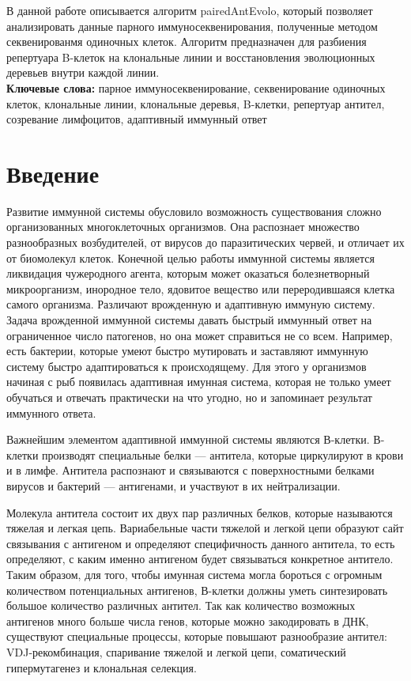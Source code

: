 \documentclass{spbau-diploma}
\begin{document}
В данной работе описывается алгоритм  pairedAntEvolo, который позволяет анализировать данные парного иммуносеквенирования, полученные методом секвенированмя одиночных клеток.
Алгоритм предназначен для разбиения репертуара B-клеток на клональные линии и восстановления эволюционных деревьев внутри каждой линии.
 \\

\textbf{Ключевые слова:} парное иммуносеквенирование, секвенирование одиночных клеток, клональные линии, клональные деревья, B-клетки, репертуар антител, созревание лимфоцитов, адаптивный иммунный ответ


\section{Введение}

Развитие иммунной системы обусловило возможность существования сложно организованных многоклеточных организмов.
Она распознает множество разнообразных возбудителей, от вирусов до паразитических червей, и отличает их от биомолекул клеток.
Конечной целью работы иммунной системы является ликвидация чужеродного агента, которым может оказаться болезнетворный микроорганизм, инородное тело, ядовитое вещество или переродившаяся клетка самого организма.
Различают врожденную и адаптивную иммуную систему.
Задача врожденной иммунной системы давать быстрый иммунный ответ на ограниченное число патогенов, но она может справиться не со всем.
Например, есть бактерии, которые умеют быстро мутировать и заставляют иммунную систему быстро адаптироваться к происходящему.
Для этого у организмов начиная с рыб появилась адаптивная имунная система, которая не только умеет обучаться и отвечать практически на что угодно, но и запоминает результат иммунного ответа.


Важнейшим элементом адаптивной иммунной системы являются В-клетки.
В-клетки производят специальные белки ---  антитела, которые циркулируют в крови и в лимфе.
Антитела распознают и связываются с поверхностными белками вирусов и бактерий --- антигенами, и участвуют в их нейтрализации.


Молекула антитела состоит их двух пар различных белков, которые называются тяжелая и легкая цепь.
Вариабельные части тяжелой и легкой цепи образуют сайт связывания с антигеном и определяют специфичность данного антитела, то есть определяют, с каким именно антигеном будет связываться конкретное антитело.
Таким образом, для того, чтобы имунная система могла бороться с огромным количеством потенциальных антигенов, В-клетки должны уметь синтезировать большое количество различных антител.
Так как количество возможных антигенов много больше числа генов, которые можно закодировать в ДНК, существуют специальные процессы, которые повышают разнообразие антител: VDJ-рекомбинация, спаривание тяжелой и легкой цепи, соматический гипермутагенез и клональная селекция.
\end{document}
